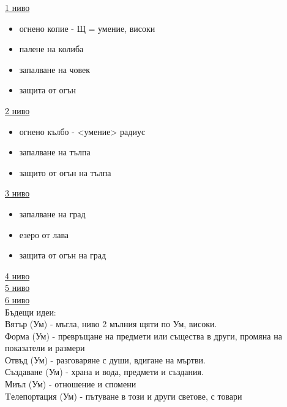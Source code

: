 \underline{1 ниво}  \\
\begin{itemize}
  \item{огнено копие - Щ = умение, високи}
  \item{палене на колиба}
  \item{запалване на човек}
  \item{защита от огън}
\end{itemize}

\underline{2 ниво}
\begin{itemize}
  \item{огнено кълбо - <умение> радиус}
  \item{запалване на тълпа}
  \item{защито от огън на тълпа}
\end{itemize}

\underline{3 ниво}
\begin{itemize}
  \item{запалване на град}
  \item{езеро от лава}
  \item{защита от огън на град}
\end{itemize}

\underline{4 ниво}  \\

\underline{5 ниво}  \\

\underline{6 ниво}  \\


Бъдещи идеи:  \\
Вятър (Ум)        - мъгла, ниво 2 мълния щяти по Ум, високи.                                         \\
Форма (Ум)        - превръщане на предмети или същества в други, промяна на показатели и размери     \\
Отвъд (Ум)        - разговаряне с души, вдигане на мъртви.                                           \\
Създаване (Ум)    - храна и вода, предмети и създания.                                               \\
Миъл (Ум)         - отношение и спомени                                                              \\
Tелепортация (Ум) - пътуване в този и други светове, с товари                                        \\






